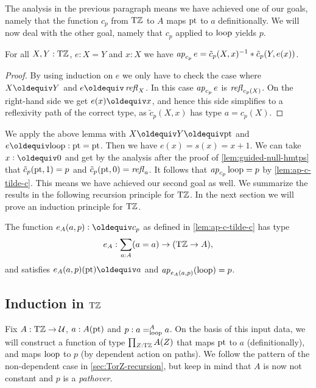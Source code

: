 \documentclass[a4,12pt]{amsart}
\begin{document}
The analysis in the previous paragraph
means we have achieved one of our goals,
namely that the function $c_p$ from ${\mathrm{T}\mathbb{Z}}$ to $A$ 
maps ${\mathord{\mathrm{pt}}}$ to $a$ definitionally.
We will now deal with the other goal,
namely that $c_p$ applied to $\mathrm{loop}$ yields $p$.

\begin{lemma}\label{lem:ap-c-tilde-c}
For all $X,Y:{\mathrm{T}\mathbb{Z}}$, $e: X=Y$ and $x:X$ we have
$\mathop{{\it ap}_{c_p}} e = \tilde c_p(X,x)^{-1}* \tilde c_p(Y,e(x))$.
\end{lemma}
\begin{proof}
By using induction on $e$ we only have to check the case where
$X\jdeq Y$ and $e\jdeq\refl{X}$. In this case $\mathop{{\it ap}_{c_p}} e$ is
$\mathop{{\it refl}_{c_p(X)}}$. On the right-hand side we get $e(x)\jdeq x$,
and hence this side simplifies to a reflexivity path of
the correct type, as $\tilde c_p(X,x)$ has type $a=c_p(X)$.
\end{proof}

We apply the above lemma with $X\jdeq Y\jdeq \pt$ and $e\jdeq\Zloop: \pt=\pt$.
Then we have $e(x)=s(x)=x+1$. We can take $x\defeq 0$ and get by
the analysis after the proof of \cref{lem:guided-null-hmtps}
that $\tilde c_p({\mathord{\mathrm{pt}}},1) = p$ and $\tilde c_p({\mathord{\mathrm{pt}}},0) = \mathop{{\it refl}_{a}}$.
It follows that $\mathop{{\it ap}_{c_p}} \mathrm{loop} = p$ by \cref{lem:ap-c-tilde-c}.
This means we have achieved our second goal as well.
We summarize the results in the following recursion principle for ${\mathrm{T}\mathbb{Z}}$.
In the next section we will prove an induction principle for ${\mathrm{T}\mathbb{Z}}$.

\begin{definition}\label{def:TorZrecursor}
The function $e_A(a,p) \defeq c_p$ as defined in \cref{lem:ap-c-tilde-c} has type
\[
e_A : \sum_{a:A}(a=a) \to ({\mathrm{T}\mathbb{Z}} \to A),
\]
and satisfies $e_A(a,p)(\pt) \jdeq a$ and 
$\mathop{{\it ap}_{e_A(a,p)}}(\mathrm{loop}) = p$.
\end{definition}

\subsection{Induction in ${\mathrm{T}\mathbb{Z}}$}\label{sec:TorZ-induction}

Fix $A:{\mathrm{T}\mathbb{Z}}\to\mathcal{U}$, $a:A({\mathord{\mathrm{pt}}})$ and $p: a=^A_{\mathrm{loop}} a$.
On the basis of this input data, we will construct a function of 
type $\prod_{Z:{\mathrm{T}\mathbb{Z}}} A(Z)$ that maps ${\mathord{\mathrm{pt}}}$ to $a$ (definitionally),
and maps $\mathrm{loop}$ to $p$ (by dependent action on paths).
We follow the pattern of the non-dependent case
in \cref{sec:TorZ-recursion}, but keep in mind that 
$A$ is now not constant and $p$ is a \emph{pathover}.
\end{document}
